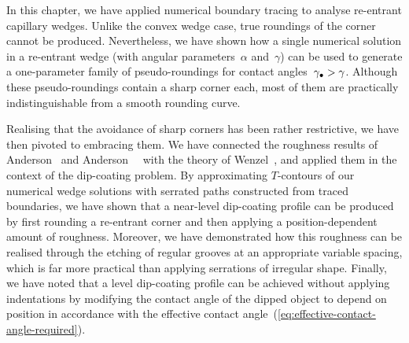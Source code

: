 In this chapter, we have applied numerical boundary tracing
to analyse re-entrant capillary wedges.
Unlike the convex wedge case,
true roundings of the corner cannot be produced.
Nevertheless, we have shown how
a single numerical solution in a re-entrant wedge
(with angular parameters~$\alpha$ and~$\gamma$)
can be used to generate a one-parameter family
of pseudo-roundings for contact angles~$\gamma_\bullet > \gamma$.
Although these pseudo-roundings contain a sharp corner each,
most of them are practically indistinguishable from a smooth rounding curve.

Realising that the avoidance of sharp corners has been rather restrictive,
we have then pivoted to embracing them.
We have connected the roughness results of
Anderson~\cite{anderson-2002-thesis-boundary-tracing-pdes}
and Anderson~\etal~\cite{anderson-2006-exact-solutions-laplace-young}
with the theory of Wenzel~\cite{wenzel-1936-resistance-solid-surfaces-wetting},
and applied them in the context of the dip-coating problem.
By approximating $T$-contours of our numerical wedge solutions
with serrated paths constructed from traced boundaries,
we have shown that a near-level dip-coating profile can be produced
by first rounding a re-entrant corner
and then applying a position-dependent amount of roughness.
Moreover, we have demonstrated how this roughness can be realised
through the etching of regular grooves at an appropriate variable spacing,
which is far more practical than applying serrations of irregular shape.
Finally, we have noted that
a level dip-coating profile can be achieved without applying indentations
by modifying the contact angle of the dipped object
to depend on position in accordance with
the effective contact angle~(\ref{eq:effective-contact-angle-required}).

